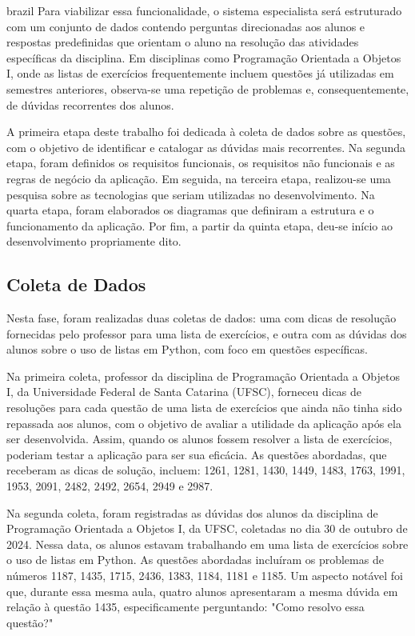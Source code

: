\begin{otherlanguage*}{brazil}
Para viabilizar essa funcionalidade, o sistema especialista será estruturado com um conjunto de dados contendo perguntas direcionadas aos alunos e respostas predefinidas que orientam o aluno na resolução das atividades específicas da disciplina. Em disciplinas como Programação Orientada a Objetos I, onde as listas de exercícios frequentemente incluem questões já utilizadas em semestres anteriores, observa-se uma repetição de problemas e, consequentemente, de dúvidas recorrentes dos alunos.

A primeira etapa deste trabalho foi dedicada à coleta de dados sobre as questões, com o objetivo de identificar e catalogar as dúvidas mais recorrentes. Na segunda etapa, foram definidos os requisitos funcionais, os requisitos não funcionais e as regras de negócio da aplicação. Em seguida, na terceira etapa, realizou-se uma pesquisa sobre as tecnologias que seriam utilizadas no desenvolvimento. Na quarta etapa, foram elaborados os diagramas que definiram a estrutura e o funcionamento da aplicação. Por fim, a partir da quinta etapa, deu-se início ao desenvolvimento propriamente dito.

\subsection{Coleta de Dados}

Nesta fase, foram realizadas duas coletas de dados: uma com dicas de resolução fornecidas pelo professor para uma lista de exercícios, e outra com as dúvidas dos alunos sobre o uso de listas em Python, com foco em questões específicas.

Na primeira coleta, professor da disciplina de Programação Orientada a Objetos I, da Universidade Federal de Santa Catarina (UFSC), forneceu dicas de resoluções para cada questão de uma lista de exercícios que ainda não tinha sido repassada aos alunos, com o objetivo de avaliar a utilidade da aplicação após ela ser desenvolvida. Assim, quando os alunos fossem resolver a lista de exercícios, poderiam testar a aplicação para ser sua eficácia. As questões abordadas, que receberam as dicas de solução, incluem: 1261, 1281, 1430, 1449, 1483, 1763, 1991, 1953, 2091, 2482, 2492, 2654, 2949 e 2987.

Na segunda coleta, foram registradas as dúvidas dos alunos da disciplina de Programação Orientada a Objetos I, da UFSC, coletadas no dia 30 de outubro de 2024. Nessa data, os alunos estavam trabalhando em uma lista de exercícios sobre o uso de listas em Python. As questões abordadas incluíram os problemas de números 1187, 1435, 1715, 2436, 1383, 1184, 1181 e 1185. Um aspecto notável foi que, durante essa mesma aula, quatro alunos apresentaram a mesma dúvida em relação à questão 1435, especificamente perguntando: "Como resolvo essa questão?"


\end{otherlanguage*}
